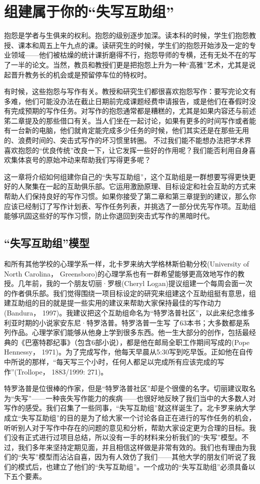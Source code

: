 \chapter{组建属于你的“失写互助组”}
抱怨是学者与生俱来的权利。抱怨的级别逐步加深。读本科的时候，学生们抱怨教授、课本和周五上午九点的课。读研究生的时候，学生们的抱怨开始涉及一定的专业领域——他们被枯燥的统计课折磨得不行，抱怨导师的专横，还有无处不在的写了一半的论文。当然，教员和教授们更是把抱怨上升为一种“高雅”艺术，尤其是说起晋升教务长的机会或是预留停车位的特权时。

有时候，这些抱怨与写作有关。教授和研究生们都很喜欢抱怨写作：要写完论文有多难，他们可能没办法在截止日期前完成课题经费申请报告，或是他们在春假时没有完成预期的写作任务。对写作的抱怨通常都是糟糕的，尤其是如果内容还与前述笫二章提及的那些借口有关。当人们坐在一起讨论，如果有更多的时间写作或者能有一台新的电脑，他们就肯定能完成多少任务的时候，他们其实还是在那些无用的、浪费时间的、突击式写作的坏习惯里转圈。 不过我们能不能想办法把学术界喜欢抱怨的“优良传统”改良一下，让它发挥一些好的作用呢？我们能否利用自身喜欢集体哀号的原始冲动来帮助我们写得更多呢？

这一章将介绍如何组建你自己的“失写互助组”，这个互助组是一群想要写得更快更好的人聚集在一起的互助俱乐部。它运用激励原理、目标设定和社会互助的方式来帮助人们保持良好的写作习惯。如果你接受了第二章和第三章提到的建议，那么你应该已经制订了写作计划表、写作任务列表，并挑选了一部分优先写作项。互助组能够巩固这些好的写作习惯，防止你退回到突击式写作的黑暗时代。

\section{“失写互助组”模型}
和所有其他学校的心理学系一样，北卡罗来纳大学格林斯伯勒分校(University of North Carolina， Greensboro)的心理学系也有一群希望能够更高效地写作的教授。几年前，我的一个朋友切丽·罗根(Cheryl Logan)提议组建一个每周会面一次的作者俱乐部。我们觉得围绕一项目标设定的研究来组建这个互助组挺有意思，组建互助组的目的就是提一些实用的建议来帮助大家保持最佳的写作动力(Bandura， 1997)。我建议把这个互助组命名为“特罗洛普社区”，以此来纪念维多利亚时期的小说家安东尼·特罗洛普。特罗洛普一生写
了63本书；大多数都是系列作品。心理学家们能够从他身上学到很多东西。他一生大部分的创作，包括最经典的《巴塞特郡纪事》（包含6部小说），都是他在邮局全职工作期间写成的(Pope Hennessy， 1971)。为了完成写作，他每天早晨从5:30写到吃早饭。正如他在自传中所说的那样，“每天写三个小时，任何人都足以完成所有应该完成的写作”(Trollope， 1883/1999: 271)。

特罗洛普是位很棒的作家，但是“特罗洛普社区”却是个很傻的名字。切丽建议取名为“失写”——一种丧失写作能力的疾病——也很好地反映了我们当中的大多数人对写作的感受。我们召集了一些同事，“失写互助组”就这样诞生了。北卡罗来纳大学成立“失写互助组”的目的是为了给大家一个讨论各自正在进行的写作任务的机会，听听别人对于写作中存在的问题的意见和分析，帮助大家设定更为合理的目标。我们没有正式进行过项目总结，所以没有一手的材料来分析我们的“失写”模型。不过，我们多年来坚持定期见面，并且相信这样做是非常有效的。我们也有理由为我们的“失写”模型而沾沾自喜，因为有人效仿了我们——其他大学的朋友们听说了我们的模式后，也建立了他们的“失写互助组”。一个成功的“失写互助组”必须具备以下五个要素。

